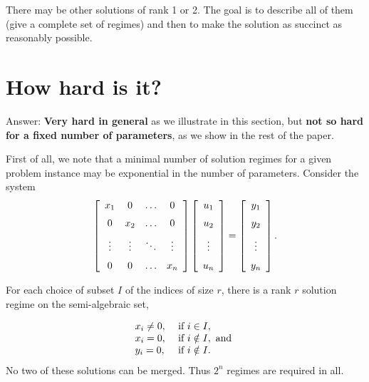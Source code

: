 \documentclass[10pt]{article}
\begin{document}

There may be other solutions of rank 1 or 2.  The goal is to describe all of
them (give a complete set of regimes) and then to make the solution as succinct as reasonably possible.

\newpage
\section{How hard is it?}

Answer:  {\bf Very hard in general} as we illustrate in this section, 
but {\bf not so hard for a fixed number of parameters}, as we show in the 
rest of the paper.

First of all, we note that a minimal number of solution regimes for a given problem instance may be exponential
in the number of parameters.  %
Consider the system
\[ 
\left [\begin {array}{cccc} 
    x_1    & 0      & \ldots & 0      \\\noalign{\medskip}
    0      & x_2    & \ldots & 0      \\\noalign{\medskip}
    \vdots & \vdots & \ddots & \vdots \\\noalign{\medskip}
    0      & 0      & \ldots & x_n    
\end {array}\right ] 
\left [\begin {array}{c} 
    u_{1} \\\noalign{\medskip}
    u_{2} \\\noalign{\medskip}
    \vdots  \\\noalign{\medskip}
    u_{n} 
\end {array}\right ]
=
\left [\begin {array}{c} 
    y_{1} \\\noalign{\medskip}
    y_{2} \\\noalign{\medskip}
    \vdots  \\\noalign{\medskip}
    y_{n} 
\end {array}\right ].
\]

For each choice of subset $I$ of the indices of size $r$,
there is a rank $r$ solution regime on 
the semi-algebraic set, 

\[\begin{array}{ll}
x_{i} \neq 0, & ~\mbox{if}~ i \in I, \\ 
x_{i} = 0, & ~\mbox{if}~ i \notin I, ~\mbox{and}~ \\
y_{i} = 0, & ~\mbox{if}~ i \notin I.
\end{array}\] 
No two of these solutions can be merged.  
Thus $2^n$ regimes are required in all.
\end{document}
